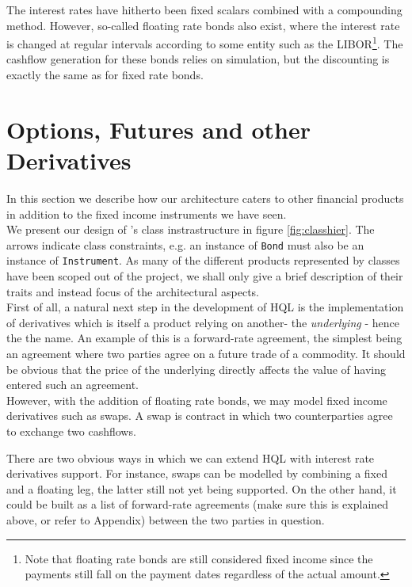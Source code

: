 The interest rates have hitherto been fixed scalars combined with a compounding 
method. However, so-called floating rate bonds also exist, where the interest 
rate is changed at regular intervals according to some entity such as the 
LIBOR\footnote{Note that floating rate bonds are still considered fixed 
income since the payments still fall on the payment dates regardless of the 
actual amount.}. The cashflow generation for these bonds relies on simulation, 
but the discounting is exactly the same as for fixed rate bonds.\\
 
\section{Options, Futures and other Derivatives}

In this section we describe how our architecture caters to other financial 
products in addition to the fixed income instruments we have seen.\\

We present our design of \hql's class instrastructure in figure \ref{fig:classhier}.
The arrows indicate class constraints, e.g. an instance of \texttt{Bond}
must also be an instance of \texttt{Instrument}. As many of the different
products represented by classes have been scoped out of the project, we shall only
give a brief description of their traits and instead focus of the architectural
aspects.\\

First of all, a natural next step in the development of HQL is the 
implementation of derivatives which is itself a product relying on another- the 
\emph{underlying} - hence the the name. An example of this is 
a forward-rate agreement, the simplest being an agreement where two parties 
agree on a future trade of a commodity. It should be obvious that the price of 
the underlying directly affects the value of having entered such an agreement.\\

However, with the addition of floating rate bonds, we may model fixed income 
derivatives such as swaps. A swap is contract in which two counterparties agree 
to exchange two cashflows.



There are two obvious ways in which we can extend HQL with interest rate 
derivatives support. For instance, swaps can be modelled by combining a fixed 
and a floating leg, the latter still not yet being supported. On the other 
hand, it could be built as a list of forward-rate agreements (make sure this is 
explained above, or refer to Appendix) between the two parties in question.
